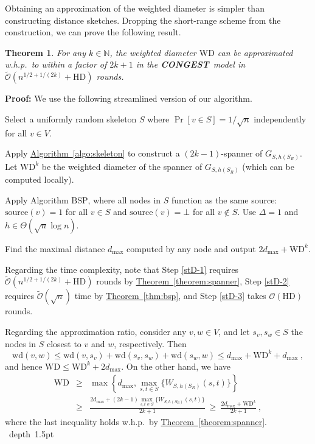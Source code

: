 \documentclass[letterpaper,11pt]{article}
\newcommand{\namedref}[2]{\hyperref[#2]{#1~\ref*{#2}}}
\newcommand{\theoremref}[1]{\namedref{Theorem}{#1}}
\newcommand{\algref}[1]{\namedref{Algorithm}{#1}}
\newtheorem{theorem}{Theorem}[section]
\newcommand{\blackslug}{\hbox{\hskip 1pt \vrule width 4pt height 8pt
depth 1.5pt \hskip 1pt}}
\newcommand{\QED}{\quad\blackslug\lower 8.5pt\null\par}
\newenvironment{proof}[1][Proof:]{\noindent \textbf{#1}\xspace}{\QED}
\newcommand{\N}{\mathbb{N}}
\newcommand{\BO}{\mathcal{O}}
\newcommand{\Src}{\mathrm{source}}
\newcommand{\CONGEST}{\textbf{CONGEST}}
\newcommand{\BSP}{\mathrm{BSP}\xspace}
\newcommand{\HD}{\mathrm{HD}}
\newcommand{\Wd}{\mathrm{wd}}
\newcommand{\WD}{\mathrm{WD}}
\begin{document}
Obtaining an approximation of the weighted diameter is simpler than constructing
distance sketches. Dropping the short-range scheme from the construction, we can
prove the following result.
\begin{theorem}\label{thm-diameter}
For any $k\in \N$, the weighted diameter $\WD$ can be approximated w.h.p.\ to
within a factor of $2k+1$ in the \CONGEST\ model in
$\tilde{\BO}(n^{1/2+1/(2k)}+\HD)$ rounds.
\end{theorem}
\begin{proof}
We use the following streamlined version of our algorithm. 
\begin{compactenum}
\item Select a uniformly random skeleton $S$ where
  $\Pr[v\in S]=1/\sqrt n$ independently for all $v\in V$.
\item \label{stD-1} Apply \algref{algo:skeleton} to construct a
  $(2k-1)$-spanner of $G_{S,h(S_R)}$. Let $\WD^k$ be the weighted
  diameter of the spanner of $G_{S,h(S_R)}$ (which can be computed
  locally).
\item \label{stD-2} Apply Algorithm $\BSP$, where
  all nodes in $S$ function as the same source: $\Src(v)=1$ for all
  $v\in S$ and $\Src(v)=\bot$ for all $v\notin S$.
Use $\Delta=1$ and  $h\in \Theta(\sqrt{n}\log n)$.
\item \label{stD-3} Find the maximal distance $d_{\max}$ computed by
  any node and output $2d_{\max}+\WD^k$.
\end{compactenum}
Regarding the time complexity, note that Step \ref{stD-1} requires
$\tilde{\BO}(n^{1/2+1/(2k)}+\HD)$ rounds by
\theoremref{theorem:spanner},
Step \ref{stD-2} requires $\tilde{\BO}(\sqrt n)$ time by
\theoremref{thm:bsp}, and Step \ref{stD-3} takes $\BO(\HD)$ rounds. 

Regarding  the approximation ratio,  consider any $v,w\in V$, and let
$s_v,s_w\in S$ the nodes in $S$ closest to $v$ and $w$,
respectively. Then
\begin{equation*}
\Wd(v,w)\leq \Wd(v,s_v)+\Wd(s_v,s_w)+\Wd(s_w,w)\leq d_{\max}+\WD^k+d_{\max}~,
\end{equation*}
and hence $\WD\le\WD^k+2d_{\max}$. 
On the other hand, we have 
\begin{eqnarray*}
\WD&\geq & \max\left\{d_{\max},\max_{s,t\in S}\{W_{S,h(S_R)}(s,t)\}\right\}\\
&\geq & \frac{2d_{\max}+(2k-1)\max_{s,t\in S}\{W_{S,h(S_R)}(s,t)\}}{2k+1}
~\geq ~ \frac{2d_{\max}+\WD^k}{2k+1}~,
\end{eqnarray*}
where the last inequality holds w.h.p.\ by
\theoremref{theorem:spanner}. 
\end{proof}
\end{document}

